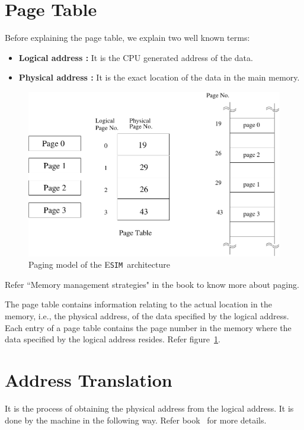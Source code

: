 \documentclass[11pt]{report}
\newcommand{\ESIM}{\textsc{E}\small{\texttt{SIM}}~}
\begin{document}
\section{Page Table}

Before explaining the page table, we explain two well known terms:
\begin{itemize}
	\item \textbf{Logical address :} It is the CPU generated address of the data. 
	\item \textbf{Physical address :} It is the exact location of the data in the main memory.
\end{itemize}

\begin{figure}[h!]
	\centering
	\includegraphics[scale=0.55]{pics/paging}
	\caption{Paging model of the \ESIM architecture}
	\label{fig:paging}
\end{figure}

Refer ``Memory management strategies" in the book \cite{galvin} to know more about paging. 

The page table contains information relating to the actual location in the memory, i.e., the physical address, of the data specified by the logical address. Each entry of a page table contains the page number in the memory where the data specified by the logical address resides. Refer figure~\ref{fig:paging}.


\section{Address Translation} 
It is the process of obtaining the physical address from the logical address. It is done by the machine in the following way. Refer book~\cite{Bach} for more details.
\end{document}
